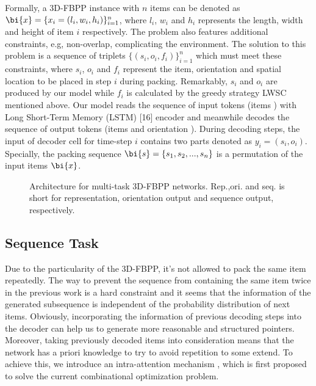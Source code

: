 Formally, a 3D-FBPP instance with $n$ items can be denoted as $\bi{x} = \{x_i=(l_i, w_i, h_i)\}_{i=1}^n$, where $l_i$, $w_i$ and $h_i$ represents the length, width and height of item $i$ respectively. The problem also features additional constraints, e.g, non-overlap, complicating the environment. The solution to this problem is a sequence of triplets $\{(s_i, o_i, f_i)\}_{i=1}^n$ which must meet these constraints, where $s_i$, $o_i$ and $f_i$ represent the item, orientation and spatial location to be placed in step $i$ during packing. Remarkably, $s_i$ and $o_i$ are produced by our model while $f_i$ is calculated by the greedy strategy LWSC mentioned above.  %
Our model reads the sequence of input tokens (items ) with Long
Short-Term Memory (LSTM) [16] encoder and meanwhile decodes
the sequence of output tokens (items  and orientation ). During decoding steps, the input of decoder cell for time-step $i$ contains two parts denoted as $y_i=(s_i, o_i)$. Specially, the packing sequence $\bi{s} =\{s_1,s_2,...,s_n\}$ is a permutation of the input items $\bi{x}$. 


\begin{figure}[h]
	\centering
	\caption{Architecture for multi-task 3D-FBPP networks. Rep.,ori. and seq. is short for representation, orientation output and sequence output, respectively. }
	\label{fig:architecture-model}
	\vspace{-10pt}
\end{figure}


\subsection{Sequence Task}
\label{sec:sequence_task}
Due to the particularity of the 3D-FBPP, it's not allowed to pack the same item repeatedly. The way to prevent the sequence from containing the same item 
twice in the previous work \cite{bahdanau2014neural} is a hard constraint and 
it seems that the information of the generated subsequence is independent of 
the probability distribution of next items.
Obviously, incorporating the information of previous decoding steps into the decoder can help us to generate more reasonable and structured pointers.   
Moreover, taking previously decoded items into consideration means that the network has a priori knowledge to try to avoid repetition to some extend.
To achieve this, we introduce an intra-attention mechanism \cite{paulus2017deep}, which is first proposed to solve the current combinational optimization problem. 

